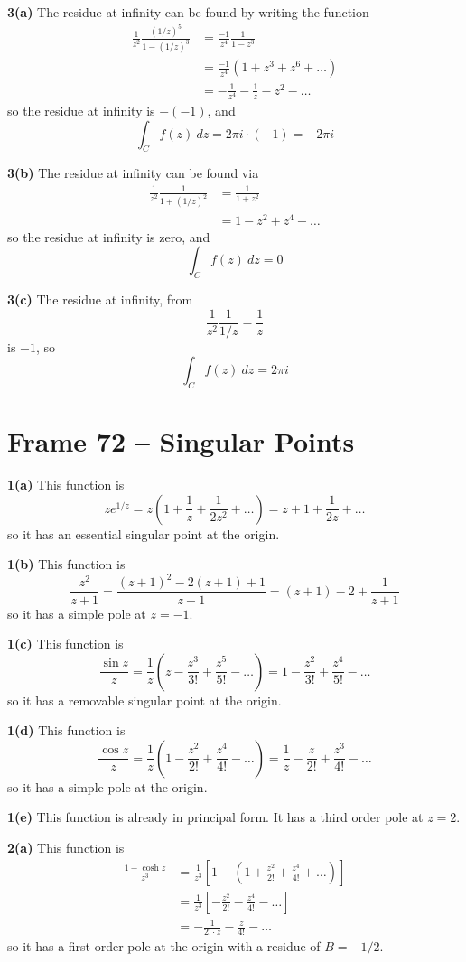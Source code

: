 \documentclass{article}
\begin{document}
\textbf{3(a)}
The residue at infinity can be found by writing the function
\begin{align*}
	\frac{1}{z^2} \frac{(1 / z)^5}{1 - (1/z)^3}
	&= \frac{-1}{z^4} \frac{1}{1 - z^3} \\
	&= \frac{-1}{z^4} \left(1 + z^3 + z^6 + \dots \right) \\
	&= -\frac{1}{z^4} - \frac{1}{z} - z^2 - \dots
\end{align*}
so the residue at infinity is $- (-1)$, and
\[
	\int_C f(z)~dz = 2\pi i \cdot (-1) = -2\pi i
\] 

\textbf{3(b)}
The residue at infinity can be found via
\begin{align*}
	\frac{1}{z^2} \frac{1}{1 + (1/z)^2} 
	&= \frac{1}{1 + z^2} \\
	&= 1 - z^2 + z^4 - \dots
\end{align*}
so the residue at infinity is zero, and
\[
	\int_C f(z)~dz = 0
\]

\textbf{3(c)}
The residue at infinity, from 
\[
	\frac{1}{z^2} \frac{1}{1/z}
	= \frac{1}{z} 
\]
is $-1$, so
\[
	\int_C f(z)~dz = 2\pi i
\]


\clearpage
\section{Frame 72 -- Singular Points}
\textbf{1(a)}
This function is
\[
	ze^{1/z}
	= z\left(1 + \frac{1}{z} + \frac{1}{2z^2} + \dots \right)
	= z + 1 + \frac{1}{2z} + \dots
\]
so it has an essential singular point at the origin.

\textbf{1(b)}
This function is
\[
	\frac{z^2}{z + 1}
	= \frac{(z+1)^2 - 2(z+1) + 1}{z + 1}
	= (z + 1) - 2 + \frac{1}{z + 1}
\]
so it has a simple pole at $z = -1$.

\textbf{1(c)}
This function is
\[
	\frac{\sin z}{z}
	= \frac{1}{z} \left(z - \frac{z^3}{3!} + \frac{z^5}{5!} - \dots \right)
	= 1 - \frac{z^2}{3!} + \frac{z^4}{5!} - \dots
\]
so it has a removable singular point at the origin.

\textbf{1(d)}
This function is
\[
	\frac{\cos z}{z}
	= \frac{1}{z} \left(1 - \frac{z^2}{2!} + \frac{z^4}{4!} - \dots \right)
	= \frac{1}{z} - \frac{z}{2!} + \frac{z^3}{4!} - \dots
\]
so it has a simple pole at the origin.

\textbf{1(e)}
This function is already in principal form. It has a third order pole at $z = 2$.

\textbf{2(a)}
This function is
\begin{align*}
	\frac{1 - \cosh z}{z^3}
	&= \frac{1}{z^3} \left[ 1 - \left( 1 + \frac{z^2}{2!} + \frac{z^4}{4!} + \dots \right) \right] \\
	&= \frac{1}{z^3} \left[ -\frac{z^2}{2!} - \frac{z^4}{4!} - \dots \right] \\
	&= -\frac{1}{2! \cdot z} - \frac{z}{4!} - \dots
\end{align*}
so it has a first-order pole at the origin with a residue of $B = -1/2$.
\end{document}
